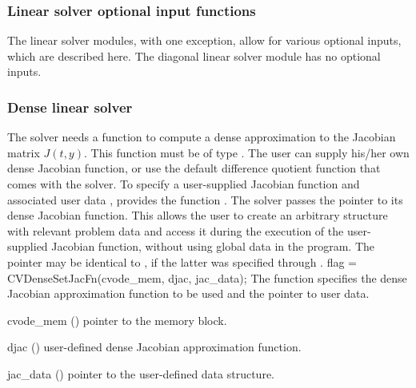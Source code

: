 \subsubsection{Linear solver optional input functions}\label{sss:optin_linsol}

The linear solver modules, with one exception, allow for various optional 
inputs, which are described here. The diagonal linear solver module has no
optional inputs.

\subsubsection{Dense linear solver}\label{sss:optin_dense}
The 
{\cvdense} solver needs a function to compute a dense approximation to
the Jacobian matrix $J(t,y)$.  This function must be of type . 
The user can supply his/her own dense Jacobian function, or use the default 
difference quotient function  
that comes with the {\cvdense} solver.
To specify a user-supplied Jacobian function  and associated user 
data , {\cvdense} provides the function .
The {\cvdense} solver passes the pointer  
to its dense Jacobian function. This allows the user to
create an arbitrary structure with relevant problem data and access it
during the execution of the user-supplied Jacobian function, without
using global data in the program.  The pointer  may be
identical to , if the latter was specified through .
{
  flag = CVDenseSetJacFn(cvode\_mem, djac, jac\_data);
}
{
  The function  specifies the dense Jacobian
  approximation function to be used and the pointer to user data.
}
{
  \begin{args}
  \item[cvode\_mem] ()
    pointer to the {\cvode} memory block.
  \item[djac] ()
    user-defined dense Jacobian approximation function.
  \item[jac\_data] ()
    pointer to the user-defined data structure.
  \end{args}
}

